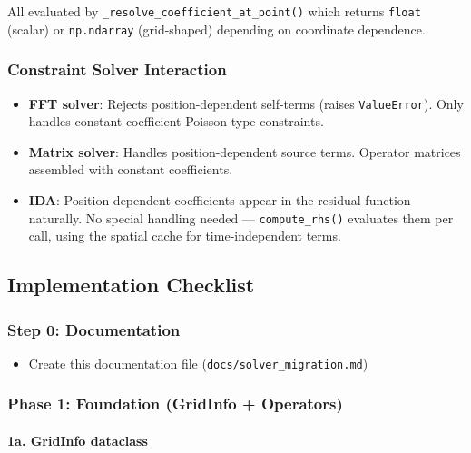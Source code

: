 All evaluated by \texttt{\_resolve\_coefficient\_at\_point()} which returns \texttt{float} (scalar)
or \texttt{np.ndarray} (grid-shaped) depending on coordinate dependence.

\subsubsection{Constraint Solver Interaction}
\label{sec:constraint-solver}

\begin{itemize}
  \item \textbf{FFT solver}: Rejects position-dependent self-terms (raises \texttt{ValueError}).
    Only handles constant-coefficient Poisson-type constraints.
  \item \textbf{Matrix solver}: Handles position-dependent source terms. Operator matrices
    assembled with constant coefficients.
  \item \textbf{IDA}: Position-dependent coefficients appear in the residual function
    naturally. No special handling needed --- \texttt{compute\_rhs()} evaluates them per
    call, using the spatial cache for time-independent terms.
\end{itemize}

\subsection{Implementation Checklist}
\label{sec:implementation-checklist}

\subsubsection{Step 0: Documentation}

\begin{itemize}
  \item[$\boxtimes$] Create this documentation file (\texttt{docs/solver\_migration.md})
\end{itemize}

\subsubsection{Phase 1: Foundation (GridInfo + Operators)}
\label{sec:phase1}

\paragraph{1a. GridInfo dataclass}
\label{par:gridinfo}

